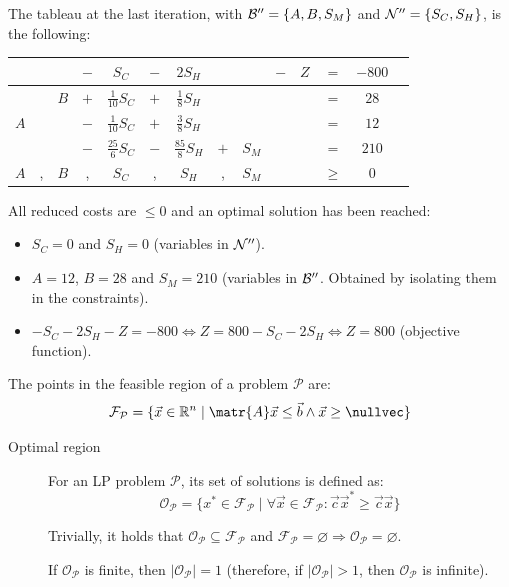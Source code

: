 \begin{example}
    The tableau at the last iteration, with $\mathcal{B}'' = \{ A, B, S_M \}$ and $\mathcal{N}'' = \{ S_C, S_H \}$, is the following:
    \begin{center}
        \begin{tabular}{cccccccccccccc}
            \toprule
             & & & $-$ & $S_C$ & $-$ & $2S_H$ & & & $-$ & $Z$ & $=$ & $-800$ \\
            \midrule
            & & $B$ & $+$ & $\frac{1}{10}S_C$ & $+$ & $\frac{1}{8}S_H$ & & & & & $=$ & $28$ \\
            $A$ & & & $-$ & $\frac{1}{10}S_C$ & $+$ & $\frac{3}{8}S_H$ & & & & & $=$ & $12$ \\
            & & & $-$ & $\frac{25}{6}S_C$ & $-$ & $\frac{85}{8}S_H$ & $+$ & $S_M$ & & & $=$ & $210$ \\
            \midrule
            $A$ & , & $B$ & , & $S_C$ & , & $S_H$ & , & $S_M$ & & & $\geq$ & 0 \\
            \bottomrule
        \end{tabular}
    \end{center}

    All reduced costs are $\leq 0$ and an optimal solution has been reached:
    \begin{itemize}
        \item $S_C = 0$ and $S_H = 0$ (variables in $\mathcal{N}''$).
        \item $A = 12$, $B = 28$ and $S_M = 210$ (variables in $\mathcal{B}''$. Obtained by isolating them in the constraints).
        \item $- S_C - 2S_H - Z = -800 \iff Z = 800 - S_C - 2S_H \iff Z = 800$ (objective function).
    \end{itemize}
\end{example}

\begin{remark}
    The points in the feasible region of a problem $\mathcal{P}$ are:
    \[ \mathcal{F}_\mathcal{P} = \{ \vec{x} \in \mathbb{R}^n \mid \matr{A}\vec{x} \leq \vec{b} \land \vec{x} \geq \nullvec \} \]
\end{remark}

\begin{description}
    \item[Optimal region] 
        For an LP problem $\mathcal{P}$, its set of solutions is defined as:
        \[ \mathcal{O}_\mathcal{P} = \{ x^* \in \mathcal{F}_\mathcal{P} \mid \forall \vec{x} \in \mathcal{F}_\mathcal{P}: \vec{c}\vec{x}^* \geq \vec{c}\vec{x} \} \]

        Trivially, it holds that $\mathcal{O}_\mathcal{P} \subseteq \mathcal{F}_\mathcal{P}$ and 
        $\mathcal{F}_\mathcal{P} = \varnothing \Rightarrow \mathcal{O}_\mathcal{P} = \varnothing$.

        \begin{theorem}
            If $\mathcal{O}_\mathcal{P}$ is finite, then $\vert \mathcal{O}_\mathcal{P} \vert = 1$ 
            (therefore, if $\vert \mathcal{O}_\mathcal{P} \vert > 1$, then $\mathcal{O}_\mathcal{P}$ is infinite).
        \end{theorem}
\end{description}


